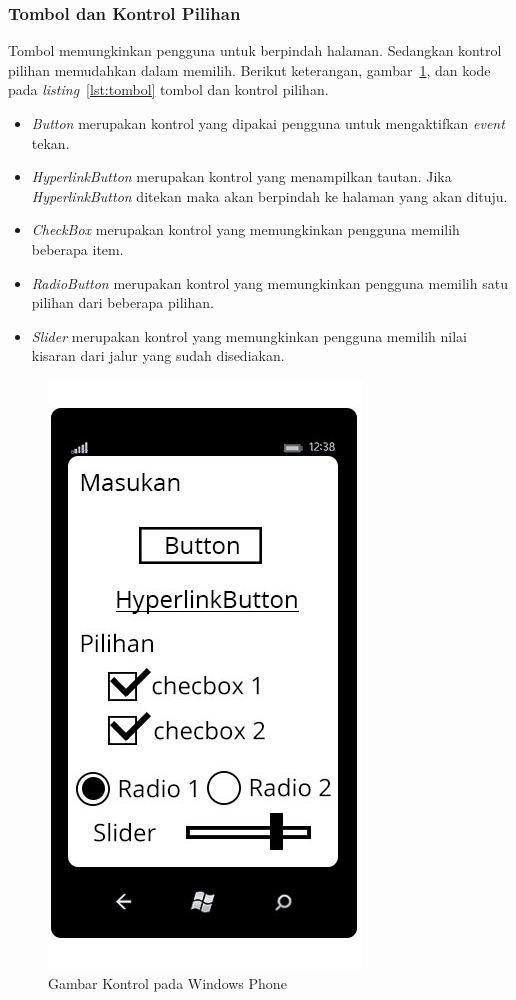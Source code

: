 \subsubsection{Tombol dan Kontrol Pilihan}
\label{subsubsec:Tombol dan Kontrol Pilihan}
\hspace{0.5cm} Tombol memungkinkan pengguna untuk berpindah halaman. Sedangkan kontrol pilihan memudahkan dalam memilih. Berikut keterangan, gambar~\ref{fig:kontrol_tombol}, dan kode pada \textit{listing}~\ref{lst:tombol} tombol dan kontrol pilihan.
 
\begin{itemize}
	\item \textit{Button} merupakan kontrol yang dipakai pengguna untuk mengaktifkan \textit{event} tekan.
	\item \textit{HyperlinkButton} merupakan kontrol yang menampilkan tautan. Jika \textit{HyperlinkButton} ditekan maka akan berpindah ke halaman yang akan dituju.	
	\item \textit{CheckBox} merupakan kontrol yang memungkinkan pengguna memilih beberapa item.
	\item \textit{RadioButton} merupakan kontrol yang memungkinkan pengguna memilih satu pilihan dari beberapa pilihan.
	\item \textit{Slider} merupakan kontrol yang memungkinkan pengguna memilih nilai kisaran dari jalur yang sudah disediakan.
\end{itemize}

\begin{figure}[h]
	\centering
		\includegraphics[scale=0.5]{Gambar/Tombol/tombol_dan_pilihan}
	\caption{Gambar Kontrol pada Windows Phone}
	\label{fig:kontrol_tombol}
\end{figure}

